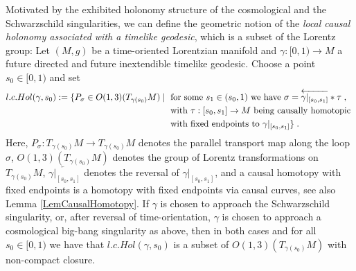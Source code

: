 \documentclass[reqno]{article}
\begin{document}
Motivated by the exhibited holonomy structure of the cosmological and the Schwarzschild singularities, we can define the geometric notion of the \emph{local causal holonomy associated with a timelike geodesic}, which is a subset of the Lorentz group:
Let $(M,g)$ be a time-oriented Lorentzian manifold and $\gamma : [0,1) \to M$ a future directed and future inextendible timelike geodesic. Choose a point $s_0 \in [0,1)$ and set
\begin{equation*}
\begin{split}
l.c.Hol(\gamma, s_0) := \{ P_{\sigma} \in O(1,3)(T_{\gamma(s_0)}M) \; | \; &\textnormal{ for some } s_1 \in (s_0, 1) \textnormal{ we have } \sigma = \overleftarrow{\gamma|_{[s_0, s_1]}} * \tau \;, \\
 &\textnormal{ with } \tau : [s_0, s_1] \to M \textnormal{ being causally homotopic } \\
 &\textnormal{ with fixed endpoints to } \gamma|_{[s_0, s_1]} \}  \;.
\end{split}
\end{equation*}
Here, $P_{\sigma} : T_{\gamma(s_0)}M \to T_{\gamma(s_0)}M$ denotes the parallel transport map along the loop $\sigma$, $O(1,3) (T_{\gamma(s_0)}M)$ denotes the group of Lorentz transformations on $T_{\gamma(s_0)}M$, $\overleftarrow{\gamma|_{[s_0, s_1]}}$ denotes the reversal of $\gamma|_{[s_0, s_1]}$, and a causal homotopy with fixed endpoints is a homotopy with fixed endpoints via causal curves, see also Lemma \ref{LemCausalHomotopy}. 
If $\gamma$ is chosen to approach the Schwarzschild singularity, or, after reversal of time-orientation, $\gamma$ is chosen to approach a cosmological big-bang singularity as above, then in both cases and for all $s_0 \in [0,1)$ we have that $l.c.Hol(\gamma, s_0) $ is a subset of $O(1,3)(T_{\gamma(s_0)}M)$ with non-compact closure. 
\newline
\end{document}
